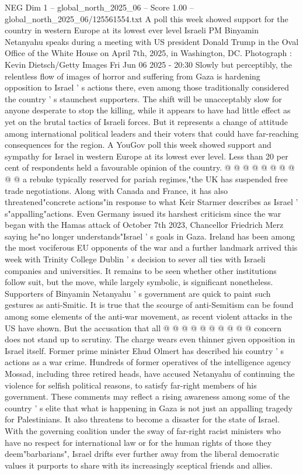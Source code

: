 \begin{textsample}{NEG Dim 1 – global\_north\_2025\_06 – Score 1.00 – global\_north\_2025\_06/125561554.txt}  \label{ex:f1_neg_144}
A poll this week showed support for the country in western Europe at its lowest ever level Israeli PM Binyamin Netanyahu speaks during a meeting with US president Donald Trump in the Oval Office of the White House on April 7th, 2025, in Washington, DC.
Photograph : Kevin Dietsch/Getty Images Fri Jun 06 2025 - 20:30 Slowly but perceptibly, the relentless flow of images of horror and suffering from Gaza is hardening opposition to Israel ' s actions there, even among those traditionally considered the country ' s staunchest supporters.
The shift will be unacceptably slow for anyone desperate to stop the killing, while it appears to have had little effect as yet on the brutal tactics of Israeli forces.
But it represents a change of attitude among international political leaders and their voters that could have far-reaching consequences for the region.
A YouGov poll this week showed support and sympathy for Israel in western Europe at its lowest ever level.
Less than 20 per cent of respondents held a favourable opinion of the country. @ @ @ @ @ @ @ @ @ @ a rebuke typically reserved for pariah regimes,"the UK has suspended free trade negotiations.
Along with Canada and France, it has also threatened"concrete actions"in response to what Keir Starmer describes as Israel ' s"appalling"actions.
Even Germany issued its harshest criticism since the war began with the Hamas attack of October 7th 2023, Chancellor Friedrich Merz saying he"no longer understands"Israel ' s goals in Gaza.
Ireland has been among the most vociferous EU opponents of the war and a further landmark arrived this week with Trinity College Dublin ' s decision to sever all ties with Israeli companies and universities.
It remains to be seen whether other institutions follow suit, but the move, while largely symbolic, is significant nonetheless.
Supporters of Binyamin Netanyahu ' s government are quick to paint such gestures as anti-Smitic.
It is true that the scourge of anti-Semitism can be found among some elements of the anti-war movement, as recent violent attacks in the US have shown.
But the accusation that all @ @ @ @ @ @ @ @ @ @ concern does not stand up to scrutiny.
The charge wears even thinner given opposition in Israel itself.
Former prime minister Ehud Olmert has described his country ' s actions as a war crime.
Hundreds of former operatives of the intelligence agency Mossad, including three retired heads, have accused Netanyahu of continuing the violence for selfish political reasons, to satisfy far-right members of his government.
These comments may reflect a rising awareness among some of the country ' s elite that what is happening in Gaza is not just an appalling tragedy for Palestinians.
It also threatens to become a disaster for the state of Israel.
With the governing coalition under the sway of far-right racist ministers who have no respect for international law or for the human rights of those they deem"barbarians", Israel drifts ever further away from the liberal democratic values it purports to share with its increasingly sceptical friends and allies.

\end{textsample}
